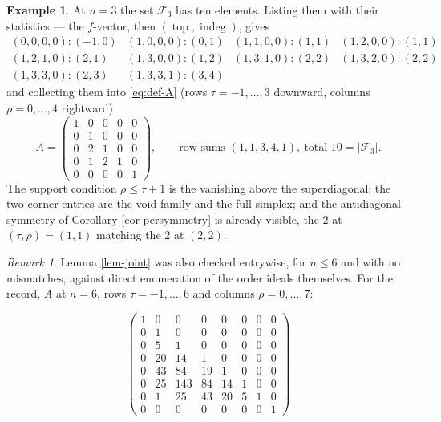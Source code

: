 \documentclass[11pt, a4paper, abstract=yes]{scrartcl}
\theoremstyle{definition}
\newtheorem{mexample}[definition]{Example}
\theoremstyle{remark}
\newtheorem{remark}[definition]{Remark}
\theoremstyle{plain}
\newcommand{\indeg}{\operatorname{indeg}}
\newcommand{\tp}{\operatorname{top}}
\begin{document}
\begin{mexample}
At \(n=3\) the set \(\mathcal F_3\) has ten elements. Listing them with their statistics --- the
\(f\)-vector, then \((\tp,\indeg)\), gives
\[
\begin{array}{llll}
 (0,0,0,0)\colon(-1,0) & (1,0,0,0)\colon(0,1) & (1,1,0,0)\colon(1,1) & (1,2,0,0)\colon(1,1)\\
 (1,2,1,0)\colon(2,1)  & (1,3,0,0)\colon(1,2) & (1,3,1,0)\colon(2,2) & (1,3,2,0)\colon(2,2)\\
 (1,3,3,0)\colon(2,3)  & (1,3,3,1)\colon(3,4) & &
\end{array}
\]
and collecting them into \eqref{eq:def-A} (rows \(\tau=-1,\dots,3\) downward, columns
\(\rho=0,\dots,4\) rightward)
\[
  A=\begin{pmatrix}
    1&0&0&0&0\\ 0&1&0&0&0\\ 0&2&1&0&0\\ 0&1&2&1&0\\ 0&0&0&0&1
  \end{pmatrix},
  \qquad \text{row sums } (1,1,3,4,1),\ \text{total }10=\lvert\mathcal F_3\rvert .
\]
The support condition \(\rho\le\tau+1\) is the vanishing above the superdiagonal; the two corner
entries are the void family and the full simplex; and the antidiagonal symmetry of
Corollary \ref{cor-persymmetry} is already visible, the \(2\) at \((\tau,\rho)=(1,1)\) matching the
\(2\) at \((2,2)\).
\label{ex-A}
\end{mexample}

\begin{remark}
Lemma \ref{lem-joint} was also checked entrywise, for \(n\le6\) and with no mismatches, against
direct enumeration of the order ideals themselves. For the record, \(A\) at \(n=6\), rows \(\tau=-1,\dots,6\) and
columns \(\rho=0,\dots,7\):
\label{rem-A-verified}
\end{remark}

\begin{equation}\label{eq:auto-13}
\begin{pmatrix}
1&0&0&0&0&0&0&0\\
0&1&0&0&0&0&0&0\\
0&5&1&0&0&0&0&0\\
0&20&14&1&0&0&0&0\\
0&43&84&19&1&0&0&0\\
0&25&143&84&14&1&0&0\\
0&1&25&43&20&5&1&0\\
0&0&0&0&0&0&0&1
\end{pmatrix}
\end{equation}
\end{document}

